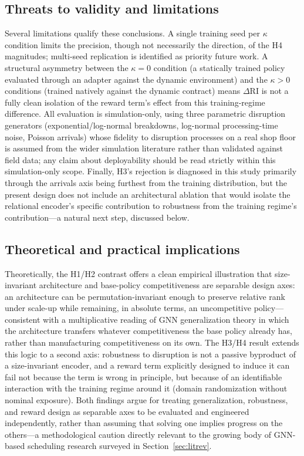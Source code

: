 \documentclass[11pt]{article}
\newcommand{\RI}{\mathrm{RI}}
\begin{document}
\subsection{Threats to validity and limitations}

Several limitations qualify these conclusions. A single training seed per $\kappa$ condition limits the precision, though not necessarily the direction, of the H4 magnitudes; multi-seed replication is identified as priority future work. A structural asymmetry between the $\kappa{=}0$ condition (a statically trained policy evaluated through an adapter against the dynamic environment) and the $\kappa{>}0$ conditions (trained natively against the dynamic contract) means $\Delta \RI$ is not a fully clean isolation of the reward term's effect from this training-regime difference. All evaluation is simulation-only, using three parametric disruption generators (exponential/log-normal breakdowns, log-normal processing-time noise, Poisson arrivals) whose fidelity to disruption processes on a real shop floor is assumed from the wider simulation literature \citep{law2024,sargent2011} rather than validated against field data; any claim about deployability should be read strictly within this simulation-only scope. Finally, H3's rejection is diagnosed in this study primarily through the arrivals axis being furthest from the training distribution, but the present design does not include an architectural ablation that would isolate the relational encoder's specific contribution to robustness from the training regime's contribution---a natural next step, discussed below.

\subsection{Theoretical and practical implications}

Theoretically, the H1/H2 contrast offers a clean empirical illustration that size-invariant architecture and base-policy competitiveness are separable design axes: an architecture can be permutation-invariant enough to preserve relative rank under scale-up while remaining, in absolute terms, an uncompetitive policy---consistent with a multiplicative reading of GNN generalization theory in which the architecture transfers whatever competitiveness the base policy already has, rather than manufacturing competitiveness on its own. The H3/H4 result extends this logic to a second axis: robustness to disruption is not a passive byproduct of a size-invariant encoder, and a reward term explicitly designed to induce it can fail not because the term is wrong in principle, but because of an identifiable interaction with the training regime around it (domain randomization without nominal exposure). Both findings argue for treating generalization, robustness, and reward design as separable axes to be evaluated and engineered independently, rather than assuming that solving one implies progress on the others---a methodological caution directly relevant to the growing body of GNN-based scheduling research surveyed in Section~\ref{sec:litrev}.
\end{document}
